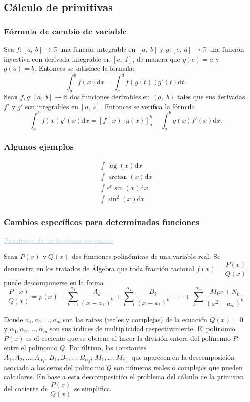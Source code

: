 \subsection{Cálculo de primitivas}
\subsubsection{Fórmula de cambio de variable}
Sea $f:[a,~b]\rightarrow\mathbb{R}$ una función integrable en $[a,~b]$ y $g:[c,~d]\rightarrow\mathbb{R}$ una función inyectiva con derivada integrable en $[c,~d]$, de manera que $g(c)=a$ y $g(d)=b$. Entonces se satisface la fórmula: \[ \int_a^bf(x)\mathrm{d}x=\int_c^df\left(g(t)\right)g'(t)\mathrm{d}t. \]
Sean $f,g:[a,~b]\rightarrow\mathbb{R}$ dos funciones derivables en $(a,~b)$ tales que sus derivadas $f'$ y $g'$ son integrables en $[a,~b]$. Entonces se verifica la fórmula \[ \int_{a}^{b}f(x)g'(x)\mathrm{d}x=\left[f(x)\cdot g(x)\right]_a^b-\int_{a}^{b}g(x)f'(x)\mathrm{d}x. \]
\subsubsection{Algunos ejemplos}
\[ \begin{array}{c}
	\int\log(x)\mathrm{d}x\\
	\int\arctan(x)\mathrm{d}x\\
	\int e^x\sin(x)\mathrm{d}x\\
	\int \sin^2(x)\mathrm{d}x
\end{array} \]
\subsubsection{Cambios específicos para determinadas funciones}
\textcolor{lightblue}{\underline{Primitivas de las facciones racionales}}

Sean $P(x)$ y $Q(x)$ dos funciones polinómicas de una variable real. Se demuestra en los tratados de Álgebra que toda fracción racional $f(x)=\dfrac{P(x)}{Q(x)}$ puede descomponerse en la forma \[ \dfrac{P(x)}{Q(x)}=p(x)+\sum_{k=1}^{\alpha_1}\dfrac{A_k}{(x-a_1)^k}+\sum_{k=1}^{\alpha_2}\dfrac{B_k}{(x-a_2)^k}+\cdots+\sum_{k=1}^{\alpha_m}\dfrac{M_kx+N_k}{(x^2-a_m)^k} \]

Donde $a_1,a_2, \hdots,a_m$ son las raíces (reales y complejas) de la ecuación $Q(x)=0$ y $\alpha_1,\alpha_2,\hdots,\alpha_m$ son sus índices de multiplicidad respectivamente. El polinomio $P(x)$ es el cociente que se obtiene al hacer la división entera del polinomio $P$ entre el polinomio $Q$. Por último, las constantes $A_1,A_2,\hdots,A_{\alpha_1};~B_1,B_2,\hdots,B_{\alpha_2};~M_1,\hdots,M_{\alpha_m}$ que aparecen en la descomposición asociada a los ceros del polinomio $Q$ son números reales o complejos que pueden calcularse. En base a esta descomposición el problema del cálculo de la primitiva del cociente de $\dfrac{P(x)}{Q(x)}$ se simplifica.

